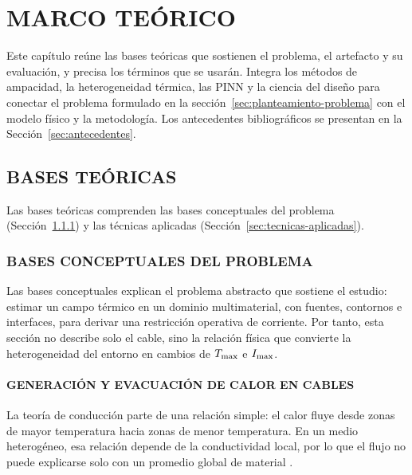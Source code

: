 \chapter{MARCO TEÓRICO}
\label{ch:marco-teorico}
\thispagestyle{empty}

Este capítulo reúne las bases teóricas que sostienen el problema, el artefacto y su evaluación, y precisa los términos que se usarán. Integra los métodos de ampacidad, la heterogeneidad térmica, las PINN y la ciencia del diseño para conectar el problema formulado en la sección~\ref{sec:planteamiento-problema} con el modelo físico y la metodología. Los antecedentes bibliográficos se presentan en la Sección~\ref{sec:antecedentes}.

\section{BASES TEÓRICAS}
\label{sec:bases-teoricas}

Las bases teóricas comprenden las bases conceptuales del problema (Sección~\ref{sec:bases-conceptuales}) y las técnicas aplicadas (Sección~\ref{sec:tecnicas-aplicadas}).

\subsection{BASES CONCEPTUALES DEL PROBLEMA}
\label{sec:bases-conceptuales}

Las bases conceptuales explican el problema abstracto que sostiene el estudio: estimar un campo térmico en un dominio multimaterial, con fuentes, contornos e interfaces, para derivar una restricción operativa de corriente. Por tanto, esta sección no describe solo el cable, sino la relación física que convierte la heterogeneidad del entorno en cambios de $T_{\max}$ e $I_{\max}$.

\subsubsection{GENERACIÓN Y EVACUACIÓN DE CALOR EN CABLES}
\label{subsec:generacion-evacuacion-calor}

La teoría de conducción parte de una relación simple: el calor fluye desde zonas de mayor temperatura hacia zonas de menor temperatura. En un medio heterogéneo, esa relación depende de la conductividad local, por lo que el flujo no puede explicarse solo con un promedio global de material \parencites{carslaw1959conduction,kakac2018heatConduction,hahn2012heatConduction}.

